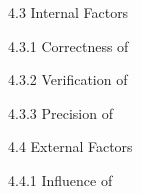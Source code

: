 4.3 Internal Factors

4.3.1 Correctness of

4.3.2 Verification of

4.3.3 Precision of


4.4 External Factors

4.4.1 Influence of 

\blinddocument
